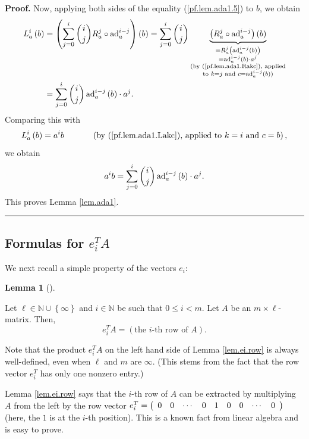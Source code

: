 \documentclass[numbers=enddot,12pt,final,onecolumn,notitlepage]{scrartcl}%
\theoremstyle{definition}
\newtheorem{lem}[theo]{Lemma}
\newenvironment{lemma}[1][]
{\begin{lem}[#1]\begin{leftbar}}
{\end{leftbar}\end{lem}}
\newenvironment{proof}[1][Proof]{\noindent\textbf{#1.} }{\ \rule{0.5em}{0.5em}}
\let\sumnonlimits\sum
\renewcommand{\sum}{\sumnonlimits\limits}
\begin{document}
\begin{proof}
Now, applying both sides of the equality (\ref{pf.lem.ada1.5}) to $b$, we
obtain%
\begin{align*}
L_{a}^{i}\left(  b\right)   &  =\left(  \sum_{j=0}^{i}\dbinom{i}{j}R_{a}%
^{j}\circ\operatorname*{ad}\nolimits_{a}^{i-j}\right)  \left(  b\right)
=\sum_{j=0}^{i}\dbinom{i}{j}\underbrace{\left(  R_{a}^{j}\circ
\operatorname*{ad}\nolimits_{a}^{i-j}\right)  \left(  b\right)  }%
_{\substack{=R_{a}^{j}\left(  \operatorname*{ad}\nolimits_{a}^{i-j}\left(
b\right)  \right)  \\=\operatorname*{ad}\nolimits_{a}^{i-j}\left(  b\right)
\cdot a^{j}\\\text{(by (\ref{pf.lem.ada1.Rakc}), applied}\\\text{to }k=j\text{
and }c=\operatorname*{ad}\nolimits_{a}^{i-j}\left(  b\right)  \text{)}}}\\
&  =\sum_{j=0}^{i}\dbinom{i}{j}\operatorname*{ad}\nolimits_{a}^{i-j}\left(
b\right)  \cdot a^{j}.
\end{align*}
Comparing this with%
\[
L_{a}^{i}\left(  b\right)  =a^{i}b\ \ \ \ \ \ \ \ \ \ \left(  \text{by
(\ref{pf.lem.ada1.Lakc}), applied to }k=i\text{ and }c=b\right)  ,
\]
we obtain
\[
a^{i}b=\sum_{j=0}^{i}\dbinom{i}{j}\operatorname*{ad}\nolimits_{a}^{i-j}\left(
b\right)  \cdot a^{j}.
\]
This proves Lemma \ref{lem.ada1}.
\end{proof}

\subsection{Formulas for $e_{i}^{T}A$}

We next recall a simple property of the vectors $e_{i}$:

\begin{lemma}
\label{lem.ei.row}Let $\ell\in\mathbb{N}\cup\left\{  \infty\right\}  $ and
$i\in\mathbb{N}$ be such that $0\leq i<m$. Let $A$ be an $m\times\ell$-matrix.
Then,%
\[
e_{i}^{T}A=\left(  \text{the }i\text{-th row of }A\right)  .
\]

\end{lemma}

Note that the product $e_{i}^{T}A$ on the left hand side of Lemma
\ref{lem.ei.row} is always well-defined, even when $\ell$ and $m$ are $\infty
$. (This stems from the fact that the row vector $e_{i}^{T}$ has only one
nonzero entry.)

Lemma \ref{lem.ei.row} says that the $i$-th row of $A$ can be extracted by
multiplying $A$ from the left by the row vector $e_{i}^{T}=\left(
\begin{array}
[c]{ccccccccc}%
0 & 0 & \cdots & 0 & 1 & 0 & 0 & \cdots & 0
\end{array}
\right)  $ (here, the $1$ is at the $i$-th position). This is a known fact
from linear algebra and is easy to prove.
\end{document}
